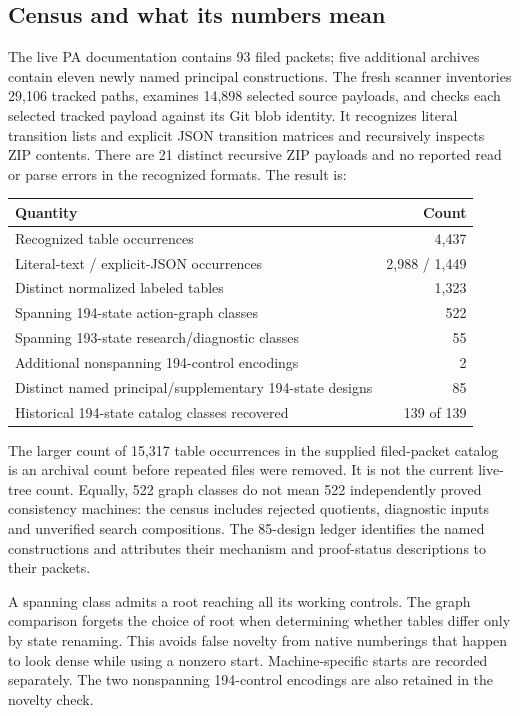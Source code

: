 \documentclass[11pt,letterpaper]{article}
\begin{document}
\subsection{Census and what its numbers mean}

The live PA documentation contains 93 filed packets; five additional
archives contain eleven newly named principal constructions. The fresh
scanner inventories 29,106 tracked paths, examines 14,898 selected
source payloads, and checks each selected tracked payload against its
Git blob identity. It recognizes literal transition lists and explicit
JSON transition matrices and recursively inspects ZIP contents.
There are 21 distinct recursive ZIP payloads and no reported read or
parse errors in the recognized formats. The result is:

\begin{center}
\begin{tabular}{@{}lr@{}}
\toprule
Quantity & Count\\\midrule
Recognized table occurrences & 4,437\\
Literal-text / explicit-JSON occurrences & 2,988 / 1,449\\
Distinct normalized labeled tables & 1,323\\
Spanning 194-state action-graph classes & 522\\
Spanning 193-state research/diagnostic classes & 55\\
Additional nonspanning 194-control encodings & 2\\
Distinct named principal/supplementary 194-state designs & 85\\
Historical 194-state catalog classes recovered & 139 of 139\\
\bottomrule
\end{tabular}
\end{center}

The larger count of 15,317 table occurrences in the supplied filed-packet
catalog is an archival count before repeated files were removed. It is
not the current live-tree count. Equally, 522 graph classes do not mean
522 independently proved consistency machines: the census includes
rejected quotients, diagnostic inputs and unverified search compositions.
The 85-design ledger identifies the named constructions and attributes
their mechanism and proof-status descriptions to their packets.

A spanning class admits a root reaching all its working controls.
The graph comparison forgets the choice of root when determining whether
tables differ only by state renaming. This avoids false novelty from
native numberings that happen to look dense while using a nonzero start.
Machine-specific starts are recorded separately. The two nonspanning
194-control encodings are also retained in the novelty check.
\end{document}
